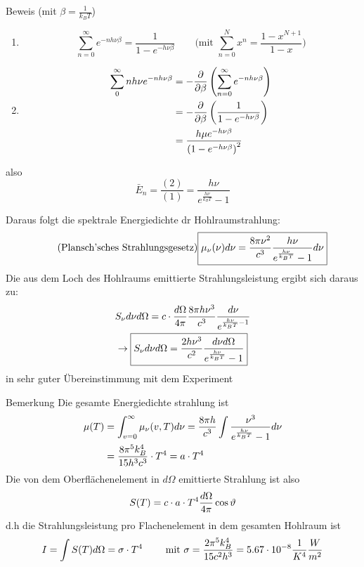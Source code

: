\begin{erl}{Beweis}
(mit $\beta = \frac{1}{k_B T}$)
\begin{enumerate}
    \item 
    \begin{equation*}
        \sum_{n=0}^\infty e^{-n h \nu \beta}
        =
        \frac{1}{1- e^{-h\nu\beta}}\qquad \text{(mit $\sum_{n=0}^N x^n =
        \frac{1-x^{N+1}}{1-x}$)}
    \end{equation*}
    \item
    \begin{align*}
        \sum_0^{\infty} n h \nu e^{-n h \nu \beta}
        &=
        - \frac{\partial}{\partial \beta} \left( \sum_{n=0}^{\infty} e^{-n h \nu \beta} \right)
        \\
        &=
        - \frac{\partial}{\partial \beta} \left( \frac{1}{1-e^{-h \nu \beta}} \right) \\
        &=
        \frac{h \mu e^{-h \nu \beta}}{\left( 1 - e^{-h \nu \beta} \right)^2}
    \end{align*}
\end{enumerate}
also
\begin{equation*}
    \bar{E}_n = \frac{(2)}{(1)}= \frac{h\nu}{e^{\frac{h \nu}{k_B T}} -1}
\end{equation*}
\end{erl}
Daraus folgt die spektrale Energiedichte dr Hohlraumstrahlung:
\begin{equation*}
    \tag*{\text{(Plansch'sches Strahlungsgesetz)}}
    \boxed{ 
    \mu_{\nu} (\nu) d\nu =
    \frac{8 \pi \nu^2}{c^3} \frac{h \nu}{e^{\frac{h \nu}{k_B T}}-1} d\nu
    }
\end{equation*}
Die aus dem Loch des Hohlraums emittierte Strahlungsleistung ergibt sich daraus
zu:
\begin{gather*}
    S_{\nu} d\nu d\Omega = c \cdot \frac{d\Omega}{4\pi} \frac{8 \pi h \nu^3}{c^3}
    \frac{d\nu}{e^{\frac{h\nu}{k_B T} -1}} \\
    \rightarrow \boxed{
        S_{\nu} d\nu d\Omega 
        =
        \frac{2 h \nu^3}{c^2} \frac{d\nu d\Omega}{e^{\frac{h\nu}{k_B T}}-1}
        }
\end{gather*}
in sehr guter Übereinstimmung mit dem Experiment
\begin{erl}{Bemerkung}
Die gesamte Energiedichte strahlung ist
\begin{align*}
    \mu(T)
    &=
    \int_{v=0}^{\infty} \mu_{\nu} (v,T) d\nu
    =
    \frac{8 \pi h}{c^3} \int \frac{\nu^3}{e^{\frac{h \nu}{k_B T}}-1} d\nu \\
    &=
    \frac{8\pi^5 k_B^4}{15 h^3 c^3}\cdot T^4 = a \cdot T^4  
\end{align*}
Die von dem Oberflächenelement in $d\Omega$ emittierte Strahlung ist also
\begin{equation*}
    S(T) = c \cdot a \cdot T^4 \frac{d\Omega}{4\pi} \cos \vartheta
\end{equation*}
d.h die Strahlungsleistung pro Flachenelement in dem gesamten Hohlraum ist
\begin{equation*}
   I = \int S(T) d\Omega = \sigma \cdot T^4 \qquad \text{ mit $\sigma = \frac{2\pi^5
   k_B^4}{15c^2 h^3} = 5.67 \cdot 10^{-8} \frac{1}{K^4}\frac{W}{m^2}$}
\end{equation*}
\end{erl}

